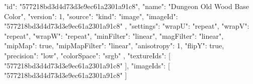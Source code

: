{
  "id": "577218bd3d4d73d3e9ec61a2301a91c8",
  "name": "Dungeon Old Wood Base Color",
  "version": 1,
  "source": {
    "kind": "image",
    "imageId": "577218bd3d4d73d3e9ec61a2301a91c8"
  },
  "settings": {
    "wrapU": "repeat",
    "wrapV": "repeat",
    "wrapW": "repeat",
    "minFilter": "linear",
    "magFilter": "linear",
    "mipMap": true,
    "mipMapFilter": "linear",
    "anisotropy": 1,
    "flipY": true,
    "precision": "low",
    "colorSpace": "srgb"
  },
  "textureIds": [
    "577218bd3d4d73d3e9ec61a2301a91c8"
  ],
  "imageIds": [
    "577218bd3d4d73d3e9ec61a2301a91c8"
  ]
}
